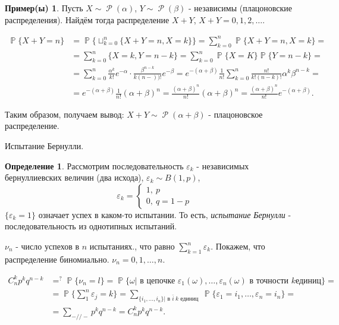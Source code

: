 \documentclass[a4paper,100pt]{article}
\theoremstyle{indented}
\theoremstyle{definition}
\newtheorem{defn}{Определение}
\newtheorem{exl}{Пример(ы)}
\theoremstyle{remark}
\DeclareMathOperator{\PP}{\mathbb{P}}
\DeclareMathOperator{\Rho}{\mathcal{P}}
\begin{document}
\begin{exl}
    Пусть $X\sim \Rho(\alpha)$, $Y\sim \Rho(\beta)$ - независимы (плацоновские распределения). Найдём тогда распределение $X+Y$, $X+Y=0, 1, 2, \ldots$. 
   
    \begin{equation*}
        \begin{aligned}
            \PP\{X+Y=n\} & =\PP\{\sqcup_{k=0}^n\{X+Y=n, X=k\}\} =\sum_{k=0}^n\PP\{X+Y=n, X=k\}= \\ 
             & = \sum_{k=0}^n\{X=k, Y=n-k\} =\sum_{k=0}^n\PP\{X=K\}\PP\{Y=n-k\}= \\ 
             & = \sum_{k=0}^n\frac{\alpha^k}{k!}e^{-\alpha}\cdot \frac{\beta^{n-k}}{k(n-))!}e^{-\beta} = e^{-(\alpha+\beta)}\frac{1}{n!}\sum_{k=0}^n\frac{n!}{k!(n-k)!}\alpha^k\beta^{n-k}= \\ 
             & = e^{-(\alpha+\beta)}\frac{1}{n!}(\alpha+\beta)^n =\frac{(\alpha+\beta)^n}{n!}(\alpha+\beta)^n=\frac{(\alpha+\beta)^n}{n!}e^{-(\alpha+\beta)}. 
        \end{aligned}
    \end{equation*}
        

    Таким образом, получаем вывод: $X+Y\sim\Rho(\alpha+\beta)$ - плацоновское распределение.
\end{exl}

Испытание Бернулли. 

\begin{defn}
    Рассмотрим последовательность $\varepsilon_k$ - независимых бернуллиевских величин (два исхода), $\varepsilon_k\sim B(1, p)$, 
    \begin{equation*}
        \varepsilon_k=
        \begin{cases}
            1, \: p \\ 
            0, \: q=1-p
        \end{cases}
    \end{equation*}
    $\{\varepsilon_k=1\}$ означает успех в каком-то испытании. То есть, \textit{испытание Бернулли} - последовательность из однотипных испытаний.
\end{defn}

$\nu_n$ - число успехов в $n$ испытаниях., что равно $\sum_{k=1}^n\varepsilon_k$. Покажем, что распределение биномиально. $\nu_n=0, 1, \ldots, n$.

\begin{equation*} 
    \begin{aligned}
        C_n^kp^kq^{n-k} & =^?\PP\{\nu_n=l\}=\PP\{\omega\vert \text{ в цепочке }\varepsilon_1(\omega), \ldots, \varepsilon_n(\omega)\text{ в точности } k \text{единиц}\}= \\ 
        & = \PP\{\sum_1^n\varepsilon_j=k\}=\sum_{\{i_1, \ldots, i_n\}| \text{ в } \bar{i} \: k \text{ единиц }}\PP\{\varepsilon_1= i_1, \ldots, \varepsilon_n=i_n\}= \\ 
        & = \sum_{-//-}p^kq^{n-k}=C_n^k p^kq^{n-k}.
    \end{aligned}
\end{equation*} 
\end{document}
